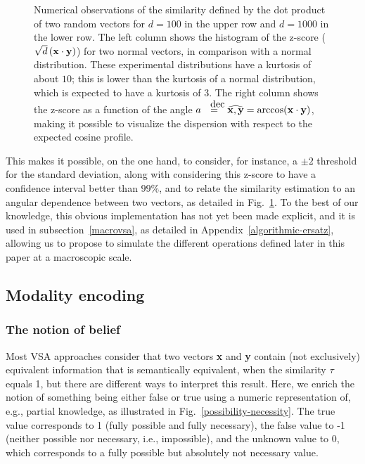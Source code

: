 \documentclass[sn-mathphys]{sn-jnl}
\begin{document}
\begin{figure}[htbp]
{\begin{tabular}{cc}
\end{tabular}}
\caption{Numerical observations of the similarity defined by the dot product of two random vectors for $d=100$ in the upper row and $d=1000$ in the lower row.
  The left column shows the histogram of the z-score ($\sqrt{d} \, ({\bf x} \cdot {\bf y})$) for two normal vectors, in comparison with a normal distribution.
  These experimental distributions have a kurtosis of about $10$; this is lower than the kurtosis of a normal distribution, which is expected to have a kurtosis of $3$.
  The right column shows the z-score as a function of the angle $a \deq \widehat{{\bf x}, {\bf y}} = \mbox{arccos}({\bf x} \cdot {\bf y})$, making it possible to visualize the dispersion with respect to the expected cosine profile.
 }
\label{z_score}
\end{figure}

This makes it possible, on the one hand, to consider, for instance, a $\pm 2$ threshold for the standard deviation, along with considering this z-score to have a confidence interval better than $99\%$, and to relate the similarity estimation to an angular dependence between two vectors, as detailed in Fig.~\ref{z_score}. To the best of our knowledge, this obvious implementation has not yet been made explicit, and it is used in subsection~\ref{macrovsa}, as detailed in Appendix~\ref{algorithmic-ersatz}, allowing us to propose to simulate the different operations defined later in this paper at a macroscopic scale.

\subsection{Modality encoding} \label{modality-encoding}

\subsubsection{The notion of belief}

Most VSA approaches consider that two vectors \textbf{x} and \textbf{y} contain (not exclusively) equivalent information that is semantically equivalent, when the similarity $\tau$ equals 1, but there are different ways to interpret this result. Here, we enrich the notion of something being either false or true using a numeric representation of, e.g., partial knowledge, as illustrated in Fig.~\ref{possibility-necessity}. The true value corresponds to 1 (fully possible and fully necessary), the false value to -1 (neither possible nor necessary, i.e., impossible), and the unknown value to 0, which corresponds to a fully possible but absolutely not necessary value.
\end{document}
